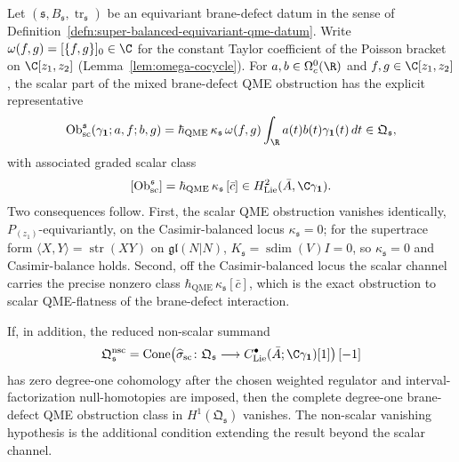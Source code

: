 \begin{thm}\label{thm:joint-super-balanced-symp-qme-vanishing}
  Let
  \((\mathfrak s,B_{\mathfrak s},\operatorname{tr}_{\mathfrak s})\)
  be an equivariant brane-defect datum in the sense of
  Definition~\ref{defn:super-balanced-equivariant-qme-datum}.  Write
  \(\omega(f,g)=[\{f,g\}]_0\in\C\) for the constant Taylor
  coefficient of the Poisson bracket on \(\C[z_1,z_2]\)
  (Lemma~\ref{lem:omega-cocycle}).  For
  \(a,b\in\Omega^0_c(\R)\) and \(f,g\in\C[z_1,z_2]\), the scalar
  part of the mixed brane-defect QME obstruction has the explicit
  representative
  \[
    \operatorname{Ob}^{\mathfrak s}_{\mathrm{sc}}
    (\gamma_{\mathbf 1};a,f;b,g)
    =
    \hbar_{\mathrm{QME}}\,\kappa_{\mathfrak s}\,
    \omega(f,g)
    \int_{\R}a(t)b(t)\gamma_{\mathbf 1}(t)\,dt
    \in\mathfrak Q_{\mathfrak s},
  \]
  with associated graded scalar class
  \[
    [\operatorname{Ob}^{\mathfrak s}_{\mathrm{sc}}]
    =
    \hbar_{\mathrm{QME}}\,\kappa_{\mathfrak s}\,
    [\bar c]
    \in
    H^2_{\mathrm{Lie}}(\bar A,\C\gamma_{\mathbf 1}).
  \]
  Two consequences follow.  First, the scalar QME obstruction
  vanishes identically, \(P_{(z_1)}\)-equivariantly, on the
  Casimir-balanced locus \(\kappa_{\mathfrak s}=0\); for the
  supertrace form \(\langle X,Y\rangle=\operatorname{str}(XY)\) on
  \(\mathfrak{gl}(N|N)\), \(K_{\mathfrak s}=\operatorname{sdim}(V)I=0\), so
  \(\kappa_{\mathfrak s}=0\) and Casimir-balance holds.  Second, off
  the Casimir-balanced locus the scalar channel carries the precise
  nonzero class \(\hbar_{\mathrm{QME}}\,\kappa_{\mathfrak s}[\bar c]\), which is the
  exact obstruction to scalar QME-flatness of the brane-defect
  interaction.

  If, in addition, the reduced non-scalar summand
  \[
    \mathfrak Q_{\mathfrak s}^{\mathrm{nsc}}
      =
      \operatorname{Cone}\!\left(
      \widehat\sigma_{\mathrm{sc}}\colon
      \mathfrak Q_{\mathfrak s}
      \longrightarrow
      C^\bullet_{\mathrm{Lie}}(\bar A;\C\gamma_{\mathbf 1})[1]
      \right)[-1]
  \]
  has zero degree-one cohomology after the chosen weighted regulator
  and interval-factorization null-homotopies are imposed, then the
	  complete degree-one brane-defect QME obstruction class in
	  \(H^1(\mathfrak Q_{\mathfrak s})\) vanishes.  The non-scalar
	  vanishing hypothesis is the additional condition extending the result
	  beyond the scalar channel.
\end{thm}

